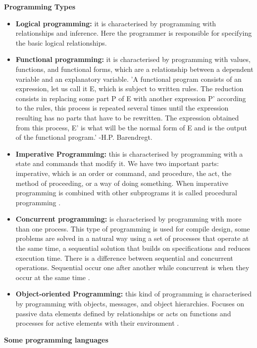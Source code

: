 \documentclass[11pt, letterpaper, english]{article}
\begin{document}
   
   \textbf{Programming Types}
   \begin{itemize}
       \item{\textbf{Logical programming:} it is characterised by programming with relationships and inference. Here the programmer is responsible for specifying the basic logical relationships.}
       \item{\textbf{Functional programming:} it is characterised by programming with values, functions, and functional forms, which are a relationship between a dependent variable and an explanatory variable. 'A functional program consists of an expression, let us call it E, which is subject to written rules. The reduction consists in replacing some part P of E with another expression P' according to the rules, this process is repeated several times until the expression resulting has no parts that have to be rewritten. The expression obtained from this process, E' is what will be the normal form of E and is the output of the functional program.' -H.P. Barendregt.}
       \item{\textbf{Imperative Programming:} this is characterised by programming with a state and commands that modify it. We have two important parts: imperative, which is an order or command, and procedure, the act, the method of proceeding, or a way of doing something. When imperative programming is combined with other subprograms it is called procedural programming  \cite{garfinkel_shevtsov_guo_2017}.}
      \item{\textbf{Concurrent programming:} is characterised by programming with more than one process. This type of programming is used for compile design, some problems are solved in a natural way using a set of processes that operate at the same time, a sequential solution that builds on specifications and reduces execution time. There is a difference between sequential and concurrent operations. Sequential occur one after another while concurrent is when they occur at the same time  \cite{garfinkel_shevtsov_guo_2017}.} \item{\textbf{Object-oriented Programming:} this kind of programming is characterised by programming with objects, messages, and object hierarchies. Focuses on passive data elements defined by relationships or acts on functions and processes for active elements with their environment  \cite{garfinkel_shevtsov_guo_2017}.} \end{itemize} 
      \textbf{Some programming languages} 
\end{document}
